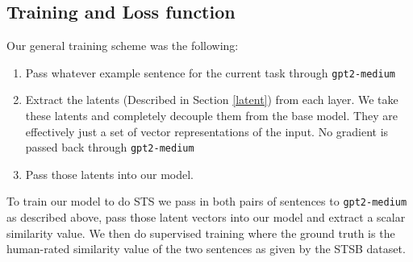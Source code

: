 \documentclass[14pt]{article}
\begin{document}
\subsection{Training and Loss function} \label{Loss} \label{Training}
Our general training scheme was the following:
\begin{enumerate}
    \item Pass whatever example sentence for the current task through \verb|gpt2-medium|
    \item Extract the latents (Described in Section \ref{latent}) from each layer. We take these latents and completely decouple them from the base model. They are effectively just a set of vector representations of the input. No gradient is passed back through \verb|gpt2-medium|
    \item Pass those latents into our model.
\end{enumerate}
To train our model to do STS we pass in both pairs of sentences to \verb|gpt2-medium| as described above, pass those latent vectors into our model and extract a scalar similarity value. We then do supervised training where the ground truth is the human-rated similarity value of the two sentences as given by the STSB dataset.
\end{document}
